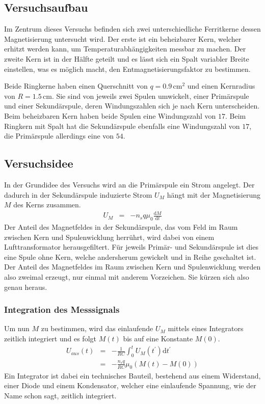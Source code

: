 \documentclass[12pt,a4paper]{scrartcl}
\numberwithin{equation}{section} %
\renewcommand{\[}{} %
\renewcommand{\]}{\noindent} %
\begin{document}
\hypertarget{versuchsaufbau}{%
\subsection{Versuchsaufbau}\label{versuchsaufbau}}
Im Zentrum dieses Versuchs befinden sich zwei unterschiedliche Ferritkerne dessen Magnetisierung untersucht wird. Der erste ist ein beheizbarer Kern, welcher erhitzt werden kann, um Temperaturabhängigkeiten messbar zu machen. Der zweite Kern ist in der Hälfte geteilt und es lässt sich ein Spalt variabler Breite einstellen, was es möglich macht, den Entmagnetisierungsfaktor zu bestimmen.

Beide Ringkerne haben einen Querschnitt von \(q=0.9\,\mathrm{cm^2}\) und einen Kernradius von \(R=1.5\,\mathrm{cm}\). Sie sind von jeweils zwei Spulen umwickelt, einer Primärspule und einer Sekundärspule, deren Windungszahlen sich je nach Kern unterscheiden. Beim beheizbaren Kern haben beide Spulen eine Windungszahl von \(17\). Beim Ringkern mit Spalt hat die Sekundärspule ebenfalls eine Windungszahl von \(17\), die Primärspule allerdings eine von \(54\).

\hypertarget{versuchsidee}{%
\subsection{Versuchsidee}\label{versuchsidee}}
In der Grundidee des Versuchs wird an die Primärspule ein Strom angelegt. Der dadurch in der Sekundärspule induzierte Strom \(U_M\) hängt mit der Magnetisierung \(M\) des Kerns zusammen.
\begin{eqnarray}
    U_M &=& -n_s q \mu_0 \frac{\mathrm dM}{\mathrm dt}
\end{eqnarray}
Der Anteil des Magnetfeldes in der Sekundärspule, das vom Feld im Raum zwischen Kern und Spulenwicklung herrührt, wird dabei von einem Lufttransformator herausgefiltert. Für jeweils Primär- und Sekundärspule ist dies eine Spule ohne Kern, welche andersherum gewickelt und in Reihe geschaltet ist. Der Anteil des Magnetfeldes im Raum zwischen Kern und Spulenwicklung werden also zweimal erzeugt, nur einmal mit anderem Vorzeichen. Sie kürzen sich also genau heraus.

\hypertarget{integration-des-messsignals}{%
\subsubsection{Integration des Messsignals}\label{integration-des-messsignals}}
Um nun \(M\) zu bestimmen, wird das einlaufende \(U_M\) mittels eines Integrators zeitlich integriert und es folgt \(M(t)\) bis auf eine Konstante \(M(0)\). 
\begin{eqnarray}
    U_{aus}(t)
        &=& -\frac{1}{R C} \int_{0}^{t} U_M(t^{\prime}) \mathrm dt^{\prime} \\
        &=& -\frac{n_s q}{R C} \mu_0 (M(t) - M(0))
\end{eqnarray}
Ein Integrator ist dabei ein technisches Bauteil, bestehend aus einem Widerstand, einer Diode und einem Kondensator, welcher eine einlaufende Spannung, wie der Name schon sagt, zeitlich integriert. 
\end{document}
